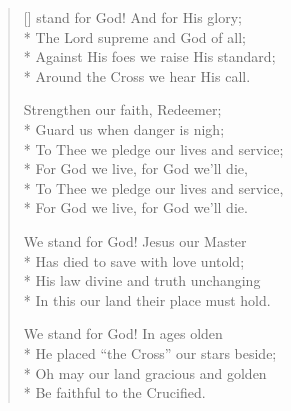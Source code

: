 \newHymn




\begin{verse}[\versewidth]
 stand for God! And for His glory;\\*
The Lord supreme and God of all;\\*
Against His foes we raise His standard;\\*
Around the Cross we hear His call.

\begin{indentedVerse}
\vin Strengthen our faith, Redeemer;\\*
\vin Guard us when danger is nigh;\\*
\vin To Thee we pledge our lives and service;\\*
\vin For God we live, for God we'll die,\\*
\vin To Thee we pledge our lives and service,\\*
\vin For God we live, for God we'll die.
\end{indentedVerse}

We stand for God! Jesus our Master\\*
Has died to save with love untold;\\*
His law divine and truth unchanging\\*
In this our land their place must hold.

We stand for God! In ages olden\\*
He placed ``the Cross'' our stars beside;\\*
Oh may our land gracious and golden\\*
Be faithful to the Crucified.
\end{verse}



